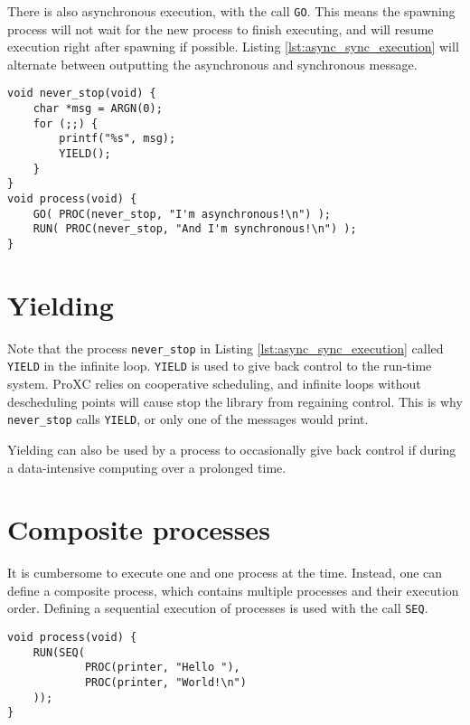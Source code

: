 There is also asynchronous execution, with the call \texttt{GO}. This means the spawning process will not wait for the new process to finish executing, and will resume execution right after spawning if possible. Listing \ref{lst:async_sync_execution} will alternate between outputting the asynchronous and synchronous message.

\noindent\begin{minipage}{\textwidth}
\begin{lstlisting}[style={CustomC},caption={Asynchronous and synchronous execution},label={lst:async_sync_execution}]
void never_stop(void) {
    char *msg = ARGN(0);
    for (;;) {
        printf("%s", msg);
        YIELD();
    }
}
void process(void) {
    GO( PROC(never_stop, "I'm asynchronous!\n") );
    RUN( PROC(never_stop, "And I'm synchronous!\n") );
}
\end{lstlisting}
\end{minipage}

\section*{Yielding}

Note that the process \texttt{never\_stop} in Listing \ref{lst:async_sync_execution} called \texttt{YIELD} in the infinite loop. \texttt{YIELD} is used to give back control to the run\hyp{}time system. ProXC relies on cooperative scheduling, and infinite loops without descheduling points will cause stop the library from regaining control. This is why \texttt{never\_stop} calls \texttt{YIELD}, or only one of the messages would print. 

Yielding can also be used by a process to occasionally give back control if during a data\hyp{}intensive computing over a prolonged time. 

\section*{Composite processes}

It is cumbersome to execute one and one process at the time. Instead, one can define a composite process, which contains multiple processes and their execution order. Defining a sequential execution of processes is used with the call \texttt{SEQ}.  

\noindent\begin{minipage}{\textwidth}
\begin{lstlisting}[style={CustomC},caption={Sequential composite process execution}]
void process(void) {
    RUN(SEQ(
            PROC(printer, "Hello "),
            PROC(printer, "World!\n")
    ));
}
\end{lstlisting}
\end{minipage}

